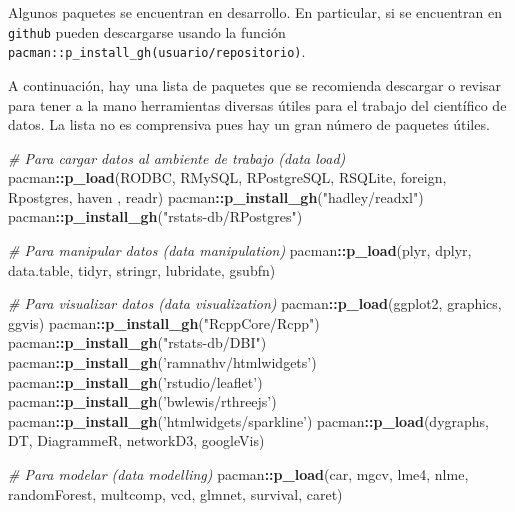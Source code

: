 \documentclass[]{article}
\newenvironment{Shaded}{\begin{snugshade}}{\end{snugshade}}
\newcommand{\KeywordTok}[1]{\textcolor[rgb]{0.13,0.29,0.53}{\textbf{#1}}}
\newcommand{\StringTok}[1]{\textcolor[rgb]{0.31,0.60,0.02}{#1}}
\newcommand{\CommentTok}[1]{\textcolor[rgb]{0.56,0.35,0.01}{\textit{#1}}}
\newcommand{\OperatorTok}[1]{\textcolor[rgb]{0.81,0.36,0.00}{\textbf{#1}}}
\newcommand{\NormalTok}[1]{#1}
\begin{document}
Algunos paquetes se encuentran en desarrollo. En particular, si se
encuentran en \texttt{github} pueden descargarse usando la función
\texttt{pacman::p\_install\_gh(\textquotesingle{}usuario/repositorio\textquotesingle{})}.

A continuación, hay una lista de paquetes que se recomienda descargar o
revisar para tener a la mano herramientas diversas útiles para el
trabajo del científico de datos. La lista no es comprensiva pues hay un
gran número de paquetes útiles.

\begin{Shaded}
\begin{Highlighting}[]
\CommentTok{# Para cargar datos al ambiente de trabajo (data load)}
\NormalTok{pacman}\OperatorTok{::}\KeywordTok{p_load}\NormalTok{(RODBC, RMySQL, RPostgreSQL, RSQLite, foreign, Rpostgres, haven}
\NormalTok{               , readr)}
\NormalTok{pacman}\OperatorTok{::}\KeywordTok{p_install_gh}\NormalTok{(}\StringTok{"hadley/readxl"}\NormalTok{)}
\NormalTok{pacman}\OperatorTok{::}\KeywordTok{p_install_gh}\NormalTok{(}\StringTok{"rstats-db/RPostgres"}\NormalTok{)}

\CommentTok{# Para manipular datos (data manipulation)}
\NormalTok{pacman}\OperatorTok{::}\KeywordTok{p_load}\NormalTok{(plyr, dplyr, data.table, tidyr, stringr, lubridate, gsubfn)}

\CommentTok{# Para visualizar datos (data visualization)}
\NormalTok{pacman}\OperatorTok{::}\KeywordTok{p_load}\NormalTok{(ggplot2, graphics, ggvis)}
\NormalTok{pacman}\OperatorTok{::}\KeywordTok{p_install_gh}\NormalTok{(}\StringTok{"RcppCore/Rcpp"}\NormalTok{)}
\NormalTok{pacman}\OperatorTok{::}\KeywordTok{p_install_gh}\NormalTok{(}\StringTok{"rstats-db/DBI"}\NormalTok{)}
\NormalTok{pacman}\OperatorTok{::}\KeywordTok{p_install_gh}\NormalTok{(}\StringTok{'ramnathv/htmlwidgets'}\NormalTok{)}
\NormalTok{pacman}\OperatorTok{::}\KeywordTok{p_install_gh}\NormalTok{(}\StringTok{'rstudio/leaflet'}\NormalTok{)}
\NormalTok{pacman}\OperatorTok{::}\KeywordTok{p_install_gh}\NormalTok{(}\StringTok{'bwlewis/rthreejs'}\NormalTok{)}
\NormalTok{pacman}\OperatorTok{::}\KeywordTok{p_install_gh}\NormalTok{(}\StringTok{'htmlwidgets/sparkline'}\NormalTok{)}
\NormalTok{pacman}\OperatorTok{::}\KeywordTok{p_load}\NormalTok{(dygraphs, DT, DiagrammeR, networkD3, googleVis)}

\CommentTok{# Para modelar (data modelling)}
\NormalTok{pacman}\OperatorTok{::}\KeywordTok{p_load}\NormalTok{(car, mgcv, lme4, nlme, randomForest, multcomp, vcd, glmnet, survival, caret)}


\end{Highlighting}
\end{Shaded}
\end{document}
